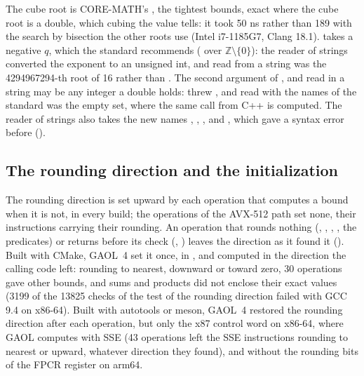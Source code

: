 \documentclass[12pt,a4paper,twoside,openright]{book}
\begin{document}
\medskip
The cube root  is CORE-MATH's , the
tightest bounds, exact where the cube root is a double, which cubing the
value tells: it took 50 ns rather than 189 with the search by bisection the
other roots use (Intel i7-1185G7, Clang 18.1).  takes
a negative $q$, which the standard recommends ( over
$\mathbb{Z}\setminus\{0\}$): the reader of strings converted the exponent to
an unsigned int, and  read from a string was the
4294967294-th root of 16 rather than . The second argument of
,  and  read in a string may be any
integer a double holds:  threw
, and  read with the
names of the standard was the empty set, where the same call from C++ is
computed. The reader of strings also takes the new names ,
, ,  and , which gave a syntax
error before ().

\subsection{The rounding direction and the initialization}
\label{sec:changes-rounding}
%

The rounding direction is set upward by each operation that computes a bound
when it is not, in every build; the operations of the AVX-512 path set none,
their instructions carrying their rounding.\newinvfive{} An operation that
rounds nothing (, , , , the
predicates) or returns before its check (,
) leaves the direction as it found it
(). Built with CMake, GAOL~4 set it once, in
, and computed in the direction the calling code left:
rounding to nearest, downward or toward zero, 30 operations gave other
bounds, and sums and products did not enclose their exact values (3199 of the
13825 checks of the test of the rounding direction failed with GCC 9.4 on
x86-64). Built with autotools or meson, GAOL~4 restored the rounding
direction after each operation, but only the x87 control word on x86-64,
where GAOL computes with SSE (43 operations left the SSE instructions
rounding to nearest or upward, whatever direction they found), and without
the rounding bits of the FPCR register on arm64.
\end{document}
